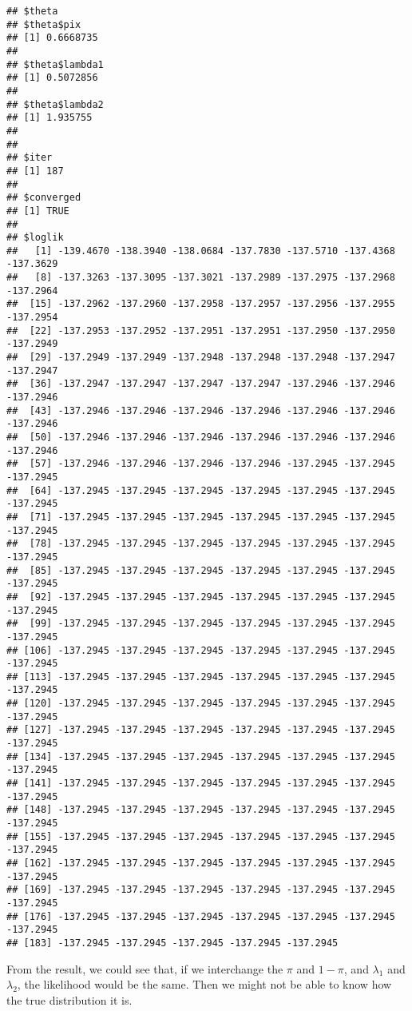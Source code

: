 \documentclass[]{article}
\begin{document}
\begin{verbatim}
## $theta
## $theta$pix
## [1] 0.6668735
## 
## $theta$lambda1
## [1] 0.5072856
## 
## $theta$lambda2
## [1] 1.935755
## 
## 
## $iter
## [1] 187
## 
## $converged
## [1] TRUE
## 
## $loglik
##   [1] -139.4670 -138.3940 -138.0684 -137.7830 -137.5710 -137.4368 -137.3629
##   [8] -137.3263 -137.3095 -137.3021 -137.2989 -137.2975 -137.2968 -137.2964
##  [15] -137.2962 -137.2960 -137.2958 -137.2957 -137.2956 -137.2955 -137.2954
##  [22] -137.2953 -137.2952 -137.2951 -137.2951 -137.2950 -137.2950 -137.2949
##  [29] -137.2949 -137.2949 -137.2948 -137.2948 -137.2948 -137.2947 -137.2947
##  [36] -137.2947 -137.2947 -137.2947 -137.2947 -137.2946 -137.2946 -137.2946
##  [43] -137.2946 -137.2946 -137.2946 -137.2946 -137.2946 -137.2946 -137.2946
##  [50] -137.2946 -137.2946 -137.2946 -137.2946 -137.2946 -137.2946 -137.2946
##  [57] -137.2946 -137.2946 -137.2946 -137.2946 -137.2945 -137.2945 -137.2945
##  [64] -137.2945 -137.2945 -137.2945 -137.2945 -137.2945 -137.2945 -137.2945
##  [71] -137.2945 -137.2945 -137.2945 -137.2945 -137.2945 -137.2945 -137.2945
##  [78] -137.2945 -137.2945 -137.2945 -137.2945 -137.2945 -137.2945 -137.2945
##  [85] -137.2945 -137.2945 -137.2945 -137.2945 -137.2945 -137.2945 -137.2945
##  [92] -137.2945 -137.2945 -137.2945 -137.2945 -137.2945 -137.2945 -137.2945
##  [99] -137.2945 -137.2945 -137.2945 -137.2945 -137.2945 -137.2945 -137.2945
## [106] -137.2945 -137.2945 -137.2945 -137.2945 -137.2945 -137.2945 -137.2945
## [113] -137.2945 -137.2945 -137.2945 -137.2945 -137.2945 -137.2945 -137.2945
## [120] -137.2945 -137.2945 -137.2945 -137.2945 -137.2945 -137.2945 -137.2945
## [127] -137.2945 -137.2945 -137.2945 -137.2945 -137.2945 -137.2945 -137.2945
## [134] -137.2945 -137.2945 -137.2945 -137.2945 -137.2945 -137.2945 -137.2945
## [141] -137.2945 -137.2945 -137.2945 -137.2945 -137.2945 -137.2945 -137.2945
## [148] -137.2945 -137.2945 -137.2945 -137.2945 -137.2945 -137.2945 -137.2945
## [155] -137.2945 -137.2945 -137.2945 -137.2945 -137.2945 -137.2945 -137.2945
## [162] -137.2945 -137.2945 -137.2945 -137.2945 -137.2945 -137.2945 -137.2945
## [169] -137.2945 -137.2945 -137.2945 -137.2945 -137.2945 -137.2945 -137.2945
## [176] -137.2945 -137.2945 -137.2945 -137.2945 -137.2945 -137.2945 -137.2945
## [183] -137.2945 -137.2945 -137.2945 -137.2945 -137.2945
\end{verbatim}

From the result, we could see that, if we interchange the \(\pi\) and
\(1-\pi\), and \(\lambda_1\) and \(\lambda_2\), the likelihood would be
the same. Then we might not be able to know how the true distribution it
is.
\end{document}

